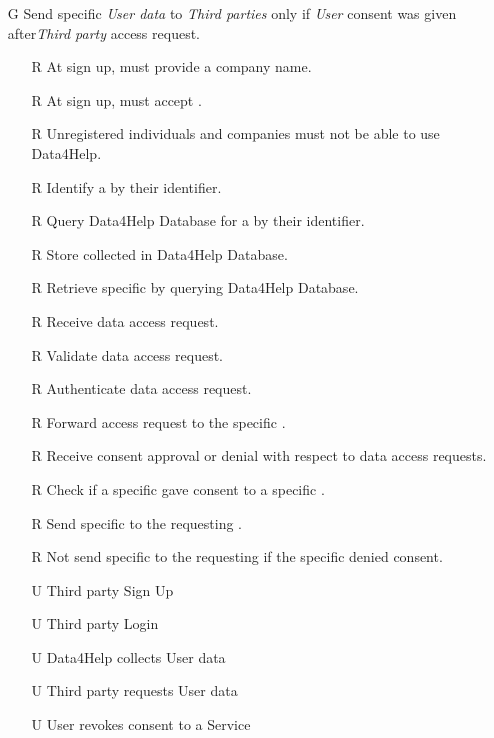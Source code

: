 \documentclass[../../../rasd.tex]{subfiles}
\begin{document}
\begin{itemize}
\begin{itemize}
	\end{itemize}

	\item[G\subs{2}]Send specific \textit{User data} to \textit{Third parties} only if \textit{User} consent was given after\textit{Third party} access request.
	\begin{itemize}
		\item[R\subs{3}]At sign up,  must provide a company name.
		\item[R\subs{5}]At sign up,  must accept .
		\item[R\subs{1}]Unregistered individuals and companies must not be able to use Data4Help.
		\item[R\subs{6}]Identify a  by their identifier.
        \item[R\subs{7}]Query Data4Help Database for a  by their identifier.
		\item[R\subs{11}]Store collected  in Data4Help Database.
		\item[R\subs{12}]Retrieve specific  by querying Data4Help Database.
		\item[R\subs{13}]Receive  data access request.
		\item[R\subs{14}]Validate  data access request.
		\item[R\subs{15}]Authenticate  data access request.
		\item[R\subs{16}]Forward  access request to the specific .
		\item[R\subs{17}]Receive  consent approval or denial with respect to  data access requests.
		\item[R\subs{18}]Check if a specific  gave consent to a specific .
		\item[R\subs{19}]Send specific to the requesting .
		\item[R\subs{20}]Not send specific to the requesting  if the specific  denied consent.
		\\
		\item[U\subs{2}]Third party Sign Up
		\item[U\subs{4}]Third party Login
		\item[U\subs{5}]Data4Help collects User data
		\item[U\subs{6}]Third party requests User data
		\item[U\subs{11}]User revokes consent to a Service
	\end{itemize}


\end{itemize}
\end{document}
